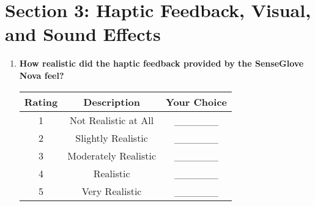 \documentclass[12pt]{article}
\begin{document}
\section*{Section 3: Haptic Feedback, Visual, and Sound Effects}
\begin{enumerate}
    \item \textbf{How realistic did the haptic feedback provided by the SenseGlove Nova feel?}
    \begin{table}[h!]
        \centering
        \begin{tabular}{|c|c|c|}
            \hline
            \textbf{Rating} & \textbf{Description} & \textbf{Your Choice} \\
            \hline
            1 & Not Realistic at All & \_\_\_\_\_\_ \\
            \hline
            2 & Slightly Realistic & \_\_\_\_\_\_ \\
            \hline
            3 & Moderately Realistic & \_\_\_\_\_\_ \\
            \hline
            4 & Realistic & \_\_\_\_\_\_ \\
            \hline
            5 & Very Realistic & \_\_\_\_\_\_ \\
            \hline
        \end{tabular}
    \end{table}
    

\end{enumerate}
\end{document}
